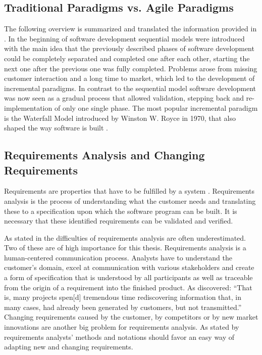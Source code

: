 \subsection{Traditional Paradigms vs. Agile Paradigms}
\label{sub:traditional-vs-agile}
The following overview is summarized and translated the information provided in \autocite{mayr_projekt_2005}.
In the beginning of software development sequential models were introduced with the main idea that the previously described phases of software development could be completely separated and completed one after each other, starting the next one after the previous one was fully completed.
Problems arose from missing customer interaction and a long time to market, which led to the development of incremental paradigms.
In contrast to the sequential model software development was now seen as a gradual process that allowed validation, stepping back and re-implementation of only one single phase.
The most popular incremental paradigm is the Waterfall Model introduced by Winston W. Royce in 1970, that also shaped the way software is built \autocite{kitchenham_research_1990}.



\subsection{Requirements Analysis and Changing Requirements}
\label{sub:requirements-analysis}
Requirements are properties that have to be fulfilled by a system \autocite{mayr_projekt_2005}.
Requirements analysis is the process of understanding what the customer needs and translating these to a specification upon which the software program can be built.
It is necessary that these identified requirements can be validated and verified.

As stated in \textcite{mayr_projekt_2005} the difficulties of requirements analysis are often underestimated.
Two of these are of high importance for this thesis.
Requirements analysis is a human-centered communication process.
Analysts have to understand the customer's domain, excel at communication with various stakeholders and create a form of specification that is understood by all participants as well as traceable from the origin of a requirement into the finished product.
As \textcite[265]{curtis_psychology_1990} discovered: ``That is, many projects spen[d] tremendous time rediscovering information that, in many cases, had already been generated by customers, but not transmitted.''
Changing requirements caused by the customer, by competitors or by new market innovations are another big problem for requirements analysis.
As stated by \textcite{mayr_projekt_2005} requirements analysts' methods and notations should favor an easy way of adapting new and changing requirements.

